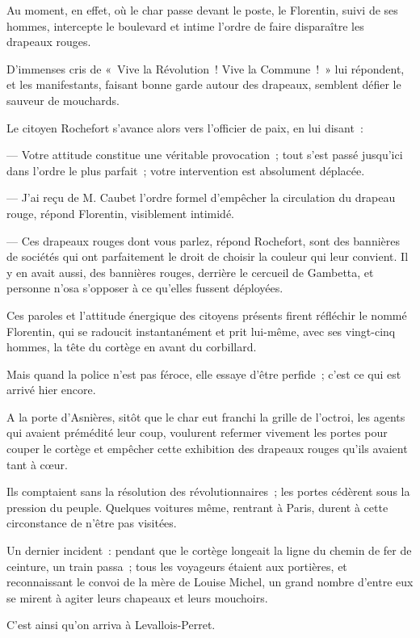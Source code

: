 \documentclass[french,twoside]{book} %
\newenvironment{quoteblock}%
  {\begin{quoting}}
  {\end{quoting}}
\newenvironment{quotebar}{%
    \def\FrameCommand{{\color{rubric!10!}\vrule width 0.5em} \hspace{0.9em}}%
    \def\OuterFrameSep{\itemsep} %
    \MakeFramed {\advance\hsize-\width \FrameRestore}
  }%
  {%
    \endMakeFramed
  }
\renewenvironment{quoteblock}%
  {%
    \savenotes
    \setstretch{0.9}
    \normalfont
    \begin{quotebar}
  }
  {%
    \end{quotebar}
    \spewnotes
  }
\begin{document}
\begin{quoteblock}
 Au moment, en effet, où le char passe devant le poste, le Florentin, suivi de ses hommes, intercepte le boulevard et intime l’ordre de faire disparaître les drapeaux rouges.\par
 D’immenses cris de « Vive la Révolution ! Vive la Commune ! » lui répondent, et les manifestants, faisant bonne garde autour des drapeaux, semblent défier le sauveur de mouchards.\par
 Le citoyen Rochefort s’avance alors vers l’officier de paix, en lui disant :\par
 — Votre attitude constitue une véritable provocation ; tout s’est passé jusqu’ici dans l’ordre le plus parfait ; votre intervention est absolument déplacée.\par
 — J’ai reçu de M. Caubet l’ordre formel d’empêcher la circulation du drapeau rouge, répond Florentin, visiblement intimidé.\par
 — Ces drapeaux rouges dont vous parlez, répond Rochefort, sont des bannières de sociétés qui ont parfaitement le droit de choisir la couleur qui leur convient. Il y en avait aussi, des bannières rouges, derrière le cercueil de Gambetta, et personne n’osa s’opposer à ce qu’elles fussent déployées.\par
 Ces paroles et l’attitude énergique des citoyens présents firent réfléchir le nommé Florentin, qui se radoucit instantanément et prit lui-même, avec ses vingt-cinq hommes, la tête du cortège en avant du corbillard.\par
   Mais quand la police n’est pas féroce, elle essaye d’être perfide ; c’est ce qui est arrivé hier encore.\par
 A la porte d’Asnières, sitôt que le char eut franchi la grille de l’octroi, les agents qui avaient prémédité leur coup, voulurent refermer vivement les portes pour couper le cortège et empêcher cette exhibition des drapeaux rouges qu’ils avaient tant à cœur.\par
 Ils comptaient sans la résolution des révolutionnaires ; les portes cédèrent sous la pression du peuple. Quelques voitures même, rentrant à Paris, durent à cette circonstance de n’être pas visitées.\par
 Un dernier incident : pendant que le cortège longeait la ligne du chemin de fer de ceinture, un train passa ; tous les voyageurs étaient aux portières, et reconnaissant le convoi de la mère de Louise Michel, un grand nombre d’entre eux se mirent à agiter leurs chapeaux et leurs mouchoirs.\par
 C’est ainsi qu’on arriva à Levallois-Perret.\par
 

\end{quoteblock}
\end{document}
